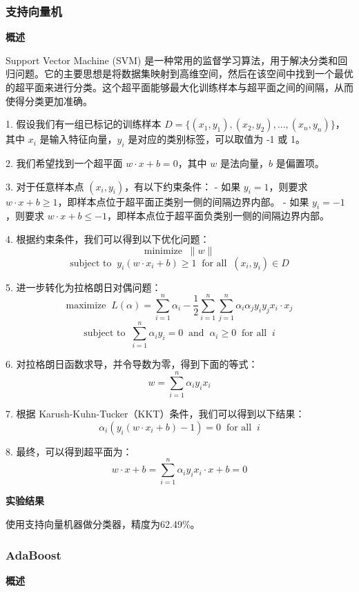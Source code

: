\documentclass[hyperref,a4paper,UTF8]{ctexart}
\begin{document}
\subsubsection{支持向量机}

\textbf{概述}


Support Vector Machine (SVM) 是一种常用的监督学习算法，用于解决分类和回归问题。它的主要思想是将数据集映射到高维空间，然后在该空间中找到一个最优的超平面来进行分类。这个超平面能够最大化训练样本与超平面之间的间隔，从而使得分类更加准确。\cite{DBLP:journals/corr/abs-1801-07883}


1. 假设我们有一组已标记的训练样本 $D = \{(x_1, y_1), (x_2, y_2), ..., (x_n, y_n)\}$，其中 $x_i$ 是输入特征向量，$y_i$ 是对应的类别标签，可以取值为 -1 或 1。

2. 我们希望找到一个超平面 $w \cdot x + b = 0$，其中 $w$ 是法向量，$b$ 是偏置项。

3. 对于任意样本点 $(x_i, y_i)$，有以下约束条件：
   - 如果 $y_i = 1$，则要求 $w \cdot x + b \geq 1$，即样本点位于超平面正类别一侧的间隔边界内部。
   - 如果 $y_i = -1$，则要求 $w \cdot x + b \leq -1$，即样本点位于超平面负类别一侧的间隔边界内部。

4. 根据约束条件，我们可以得到以下优化问题：
   $$\text{minimize} \;\; \|w\|$$
   $$\text{subject to} \;\; y_i(w \cdot x_i + b) \geq 1 \;\; \text{for all} \;\; (x_i, y_i) \in D$$

5. 进一步转化为拉格朗日对偶问题：
   $$\text{maximize} \;\; L(\alpha) = \sum_{i=1}^{n}\alpha_i - \frac{1}{2}\sum_{i=1}^{n}\sum_{j=1}^{n}\alpha_i\alpha_jy_iy_jx_i\cdot x_j$$
   $$\text{subject to} \;\; \sum_{i=1}^{n}\alpha_iy_i = 0 \;\; \text{and} \;\; \alpha_i \geq 0 \;\; \text{for all} \;\; i$$

6. 对拉格朗日函数求导，并令导数为零，得到下面的等式：
   $$w = \sum_{i=1}^{n}\alpha_iy_ix_i$$

7. 根据 Karush-Kuhn-Tucker（KKT）条件，我们可以得到以下结果：
   $$\alpha_i(y_i(w \cdot x_i + b) - 1) = 0 \;\; \text{for all} \;\; i$$

8. 最终，可以得到超平面为：
   $$w \cdot x + b = \sum_{i=1}^{n}\alpha_iy_ix_i \cdot x + b = 0$$

\textbf{实验结果}


使用支持向量机器做分类器，精度为62.49\%。

\subsubsection{AdaBoost}

\textbf{概述}
\end{document}
